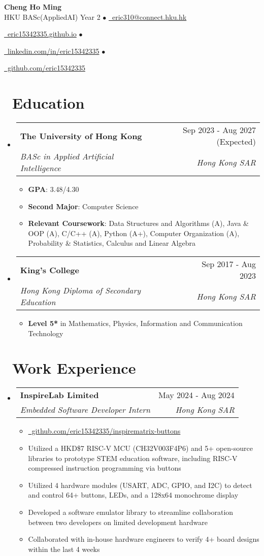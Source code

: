 \documentclass[a4paper,11pt]{article}
\makeatletter
\newcommand{\iconlink}[3]{
  \href{#2}{#1~#3}
}
\newcommand{\iconsection}[2]{
  \section[#2]{#1~#2}
}
\newcommand{\resumeItem}[1]{
  \item\small{
    {#1 \vspace{-2pt}}
  }
}
\newcommand{\resumeSubheading}[4]{
  \vspace{-2pt}\item
    \begin{tabular*}{0.97\textwidth}[t]{l@{\extracolsep{\fill}}r}
      \textbf{#1} & #2 \\
      \textit{\small#3} & \textit{\small #4} \\
    \end{tabular*}\vspace{-7pt}
}
\newcommand{\resumeSubHeadingListStart}{\begin{itemize}[leftmargin=0.15in, label={}]}
\newcommand{\resumeSubHeadingListEnd}{\end{itemize}}
\newcommand{\resumeItemListStart}{\begin{itemize}}
\newcommand{\resumeItemListEnd}{\end{itemize}\vspace{-5pt}}
\makeatother
\begin{document}
\begin{center}
    \textbf{\Huge Cheng Ho Ming} \\ \vspace{1pt}
    \small
    HKU BASc(AppliedAI) Year 2 $\bullet$ \iconlink{\faEnvelope}{mailto:eric310@connect.hku.hk}{eric310@connect.hku.hk} \\ \vspace{1pt}
    \iconlink{\faGlobe}{https://eric15342335.github.io/}{eric15342335.github.io} $\bullet$ 
    \iconlink{\faLinkedin}{https://linkedin.com/in/eric15342335}{linkedin.com/in/eric15342335} $\bullet$
    \iconlink{\faGithub}{https://github.com/eric15342335}{github.com/eric15342335}
\end{center}

\iconsection{\faGraduationCap}{Education}
  \resumeSubHeadingListStart
    \resumeSubheading
      {The University of Hong Kong}{Sep 2023 - Aug 2027 (Expected)}
      {BASc in Applied Artificial Intelligence}{Hong Kong SAR}
      \resumeItemListStart
        \resumeItem{\textbf{GPA}: 3.48/4.30}
        \resumeItem{\textbf{Second Major}: Computer Science}
        \resumeItem{\textbf{Relevant Coursework}: Data Structures and Algorithms (A), Java \& OOP (A), C/C++ (A), Python (A+), Computer Organization (A), Probability \& Statistics, Calculus and Linear Algebra}
      \resumeItemListEnd
    \resumeSubheading
      {King's College}{Sep 2017 - Aug 2023}
      {Hong Kong Diploma of Secondary Education}{Hong Kong SAR}
      \resumeItemListStart
        \resumeItem{\textbf{Level 5*} in Mathematics, Physics, Information and Communication Technology}
      \resumeItemListEnd
  \resumeSubHeadingListEnd

\iconsection{\faBriefcase}{Work Experience}
  \resumeSubHeadingListStart
    \resumeSubheading
      {InspireLab Limited}{May 2024 - Aug 2024}
      {Embedded Software Developer Intern}{Hong Kong SAR}
      \resumeItemListStart
        \resumeItem{\iconlink{\faGithub}{https://github.com/eric15342335/inspirematrix-buttons}{github.com/eric15342335/inspirematrix-buttons}}
        \resumeItem{Utilized a HKD\$7 RISC-V MCU (CH32V003F4P6) and 5+ open-source libraries to prototype STEM education software, including RISC-V compressed instruction programming via buttons}
        \resumeItem{Utilized 4 hardware modules (USART, ADC, GPIO, and I2C) to detect and control 64+ buttons, LEDs, and a 128x64 monochrome display}
        \resumeItem{Developed a software emulator library to streamline collaboration between two developers on limited development hardware}
        \resumeItem{Collaborated with in-house hardware engineers to verify 4+ board designs within the last 4 weeks}
      \resumeItemListEnd
  \resumeSubHeadingListEnd
\end{document}
